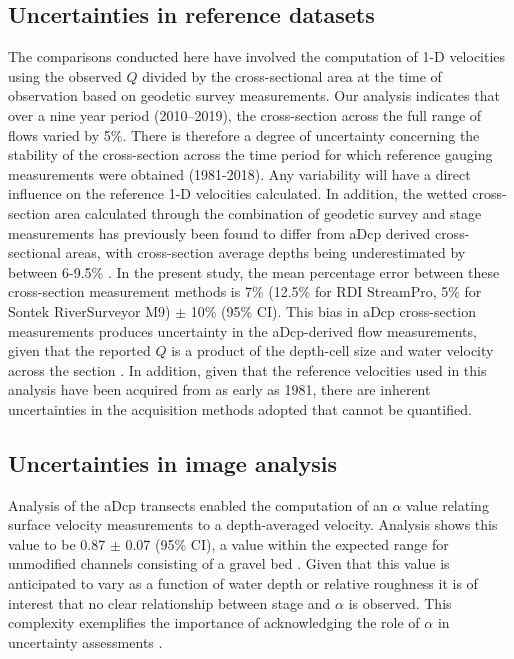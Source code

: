 \documentclass[hess, manuscript]{copernicus}
\begin{document}
\subsection{Uncertainties in reference datasets}
The comparisons conducted here have involved the computation of 1-D velocities using the observed $Q$ divided by the cross-sectional area at the time of observation based on geodetic survey measurements. Our analysis indicates that over a nine year period (2010--2019), the cross-section across the full range of flows varied by 5\%. There is therefore a degree of uncertainty concerning the stability of the cross-section across the time period for which reference gauging measurements were obtained (1981-2018). Any variability will have a direct influence on the reference 1-D velocities calculated. In addition, the wetted cross-section area calculated through the combination of geodetic survey and stage measurements has previously been found to differ from aDcp derived cross-sectional areas, with cross-section average depths being underestimated by between 6-9.5\% \citep{Kim2015}. In the present study, the mean percentage error between these cross-section measurement methods is 7\% (12.5\% for RDI StreamPro, 5\% for Sontek RiverSurveyor M9) $\pm$ 10\% (95\% CI). This bias in aDcp cross-section measurements produces uncertainty in the aDcp-derived flow measurements, given that the reported $Q$ is a product of the depth-cell size and water velocity across the section \citep{mueller2009measuring}. In addition, given that the reference velocities used in this analysis have been acquired from as early as 1981, there are inherent uncertainties in the acquisition methods adopted that cannot be quantified.

\subsection{Uncertainties in image analysis}
Analysis of the aDcp transects enabled the computation of an $\alpha$ value relating surface velocity measurements to a depth-averaged velocity. Analysis shows this value to be 0.87 $\pm$ 0.07 (95\% CI), a value within the expected range for unmodified channels consisting of a gravel bed \citep{turnipseed2010discharge}. Given that this value is anticipated to vary as a function of water depth or relative roughness it is of interest that no clear relationship between stage and $\alpha$ is observed. This complexity exemplifies the importance of acknowledging the role of $\alpha$ in uncertainty assessments \citep{hauet2018velocity}.
\end{document}
